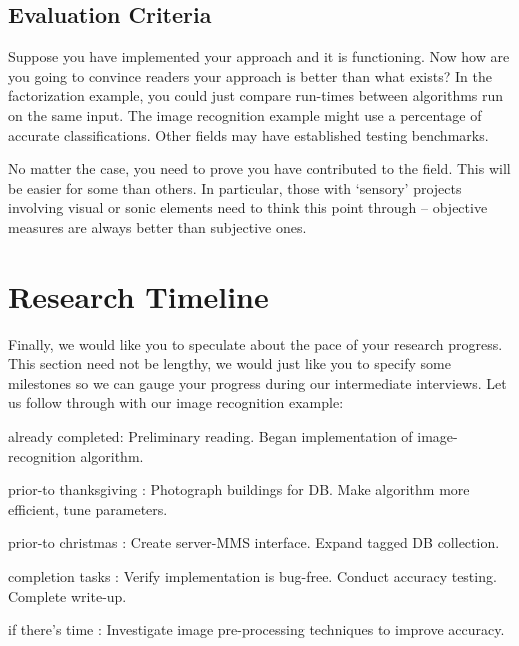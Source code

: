 \documentclass{sig-alternate}
\begin{document}
\subsection{Evaluation Criteria}
\label{subsec:eval_criteria}
Suppose you have implemented your approach and it is functioning. Now
how are you going to convince readers your approach is better than
what exists? In the factorization example, you could just compare
run-times between algorithms run on the same input. The image
recognition example might use a percentage of accurate
classifications. Other fields may have established testing benchmarks.

No matter the case, you need to prove you have contributed to the
field. This will be easier for some than others. In particular, those
with `sensory' projects involving visual or sonic elements need to
think this point through -- objective measures are always better than
subjective ones.

\section{Research Timeline}
\label{sec:research_timeline}
Finally, we would like you to speculate about the pace of your
research progress. This section need not be lengthy, we would just
like you to specify some milestones so we can gauge your progress
during our intermediate interviews. Let us follow through with our
image recognition example:

\begin{itemize*}
	\item {\sc already completed}: Preliminary reading. Began implementation of image-recognition algorithm.\vspace{3pt}
	\item {\sc prior-to thanksgiving} : Photograph buildings for DB. Make algorithm more efficient, tune parameters.\vspace{3pt}
	\item {\sc prior-to christmas} : Create server-MMS interface. Expand tagged DB collection.\vspace{3pt}
	\item {\sc completion tasks} : Verify implementation is bug-free. Conduct accuracy testing. Complete write-up.\vspace{3pt}
	\item {\sc if there's time} : Investigate image pre-processing techniques to improve accuracy.
\end{itemize*}
\end{document}
